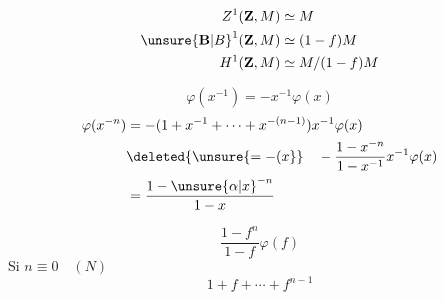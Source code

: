 {
\begin{align*}
Z^1(\mathbf Z,M)&\simeq M\\
\unsure{\mathbf B|B}^1(\mathbf Z,M)&\simeq(1-f)M\\
H^1(\mathbf Z,M)&\simeq M/(1-f)M
\end{align*}

\[
\varphi(x^{-1})=-x^{-1}\varphi(x)
\]
\begin{align*}
\varphi(x^{-n})&=-(1+x^{-1}+\cdots+x^{-(n-1)})x^{-1}\varphi(x)\\
&\deleted{\unsure{=-(x}}\quad-\frac{1-x^{-n}}{1-x^{-1}}x^{-1}\varphi(x)\\
&=\frac{1-\unsure{\alpha|x}^{-n}}{1-x}
\end{align*}

\[
\frac{1-f^n}{1-f}\varphi(f)
\]
Si $n\equiv0\quad(N)$
\[
1+f+\cdots+f^{n-1}
\]
}

